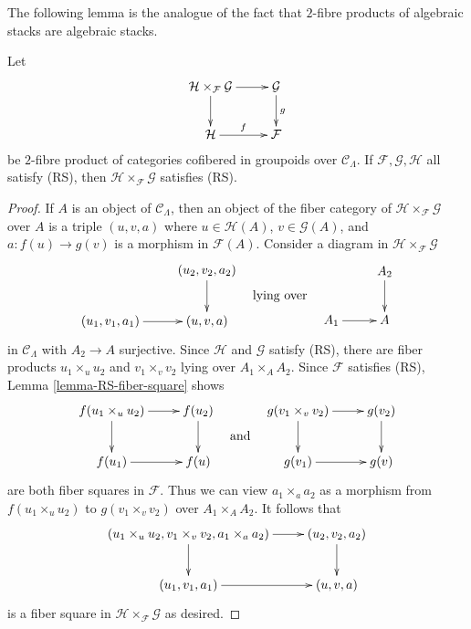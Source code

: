 \noindent
The following lemma is the analogue of the fact that $2$-fibre products
of algebraic stacks are algebraic stacks.

\begin{lemma}
\label{lemma-RS-fiber-product-morphisms}
Let
$$
\xymatrix{
\mathcal{H} \times_\mathcal{F} \mathcal{G} \ar[r] \ar[d] &
\mathcal{G} \ar[d]^g \\
\mathcal{H} \ar[r]^f & \mathcal{F}
}
$$
be $2$-fibre product of categories cofibered in groupoids over
$\mathcal{C}_\Lambda$. If $\mathcal{F}, \mathcal{G}, \mathcal{H}$
all satisfy (RS), then $\mathcal{H} \times_\mathcal{F} \mathcal{G}$
satisfies (RS).
\end{lemma}

\begin{proof}
If $A$ is an object of $\mathcal{C}_\Lambda$, then an object of the fiber
category of $\mathcal{H} \times_\mathcal{F} \mathcal{G}$ over $A$
is a triple $(u, v, a)$ where $u \in \mathcal{H}(A)$, $v \in \mathcal{G}(A)$,
and $a : f(u) \to g(v)$ is a morphism in $\mathcal{F}(A)$. Consider
a diagram in $\mathcal{H} \times_\mathcal{F} \mathcal{G}$
$$
\vcenter{
\xymatrix{
           & (u_2, v_2, a_2) \ar[d] \\
(u_1, v_1, a_1) \ar[r] & (u, v, a)
}
}
\quad\text{lying over}\quad
\vcenter{
\xymatrix{
           & A_2 \ar[d] \\
A_1 \ar[r] & A
}
}
$$
in $\mathcal{C}_\Lambda$ with $A_2 \to A$ surjective. Since
$\mathcal{H}$ and $\mathcal{G}$ satisfy (RS), there are fiber
products $u_1 \times_u u_2$ and $v_1 \times_v v_2$ lying over
$A_1 \times_A A_2$. Since $\mathcal{F}$ satisfies (RS),
Lemma \ref{lemma-RS-fiber-square} shows
$$
\vcenter{
\xymatrix{
f(u_1 \times_u u_2) \ar[r] \ar[d] & f(u_2) \ar[d] \\
f(u_1) \ar[r] & f(u)
}
}
\quad\text{and}\quad
\vcenter{
\xymatrix{
g(v_1 \times_v v_2) \ar[r] \ar[d] & g(v_2) \ar[d] \\
g(v_1) \ar[r] & g(v)
}
}
$$
are both fiber squares in $\mathcal{F}$. Thus we can view
$a_1 \times_a a_2$ as a morphism from $f(u_1 \times_u u_2)$ to
$g(v_1 \times_v v_2)$ over $A_1 \times_A A_2$.
It follows that
$$
\xymatrix{
 (u_1 \times_u u_2, v_1 \times_v v_2, a_{1} \times_a a_2) \ar[d] \ar[r] &
(u_2, v_2, a_2) \ar[d] \\
(u_1, v_1, a_1) \ar[r] & (u, v, a)
}
$$
is a fiber square in $\mathcal{H} \times_\mathcal{F} \mathcal{G}$
as desired.
\end{proof}


















